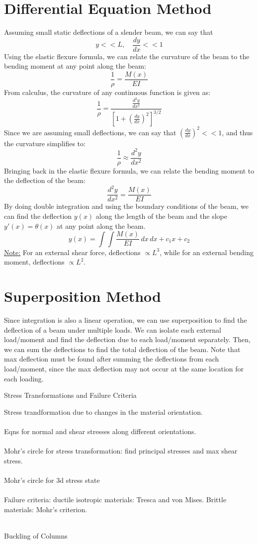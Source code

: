 \documentclass[12pt]{article}
\begin{document}
\section*{Differential Equation Method}
Assuming small static deflections of a slender beam, we can say that
\[y<<L, \quad \frac{dy}{dx} << 1\]
Using the elastic flexure formula, we can relate the curvature of the beam to the bending moment at any point along the beam:
\[\frac{1}{\rho} = \frac{M(x)}{EI}\]
From calculus, the curvature of any continuous function is given as:
\[\frac{1}{\rho} = \frac{\frac{d^2 y}{dx^2}}{\left[1 + \left(\frac{dy}{dx}\right)^2\right]^{3/2}}\]
Since we are assuming small deflections, we can say that $\left(\frac{dy}{dx}\right)^2 << 1$, and thus the curvature simplifies to:
\[\frac{1}{\rho} \approx \frac{d^2 y}{dx^2}\]
Bringing back in the elastic flexure formula, we can relate the bending moment to the deflection of the beam:
\[\boxed{\frac{d^2 y}{dx^2} = \frac{M(x)}{EI}}\]
By doing double integration and using the boundary conditions of the beam, we can find the deflection $y(x)$ along the length of the beam and the slope $y'(x) = \theta(x)$ at any point along the beam.
\[y(x) = \int \int \frac{M(x)}{EI}\,dx\,dx+c_1x+c_2\]
\underline{Note:} For an external shear force, deflections $\propto L^3$, while for an external bending moment, deflections $\propto L^2$.
\section*{Superposition Method}
Since integration is also a linear operation, we can use superposition to find the deflection of a beam under multiple loads. We can isolate each external load/moment and find the deflection due to each load/moment separately. Then, we can sum the deflections to find the total deflection of the beam. Note that max deflection must be found after summing the deflections from each load/moment, since the max deflection may not occur at the same location for each loading.

\newpage
{\centering\LARGE Stress Transformations and Failure Criteria\par}\noindent
Stress trandformation due to changes in the material orientation.\\\\
Eqns for normal and shear stresses along different orientations.\\\\
Mohr's circle for stress transformation: find principal stresses and max shear stress.\\\\
Mohr's circle for 3d stress state\\\\
Failure criteria: ductile isotropic materials: Tresca and von Mises. Brittle materials: Mohr's criterion.\\\\
\newpage
{\centering\LARGE Buckling of Columns\par}\noindent
\end{document}
